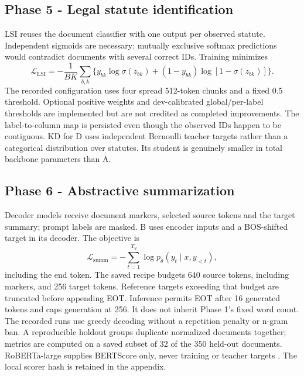 \documentclass[11pt, oneside]{article}
\newcommand{\mainbreak}{\clearpage}
\begin{document}
\mainbreak
\subsection{Phase 5 - Legal statute identification}
LSI reuses the document classifier with one output per observed statute. Independent sigmoids are
necessary: mutually exclusive softmax predictions would contradict documents with several correct IDs.
Training minimizes
\[
\mathcal L_{\mathrm{LSI}}=-\frac1{BK}\sum_{b,k}
\{y_{bk}\log\sigma(z_{bk})+(1-y_{bk})\log[1-\sigma(z_{bk})]\}.
\]
The recorded configuration uses four spread 512-token chunks and a fixed 0.5 threshold. Optional positive
weights and dev-calibrated global/per-label thresholds are implemented but are not credited as completed
improvements. The label-to-column map is persisted even though the observed IDs happen to be contiguous.
KD for D uses independent Bernoulli teacher targets rather than a categorical distribution over statutes.
Its student is genuinely smaller in total backbone parameters than A.

\subsection{Phase 6 - Abstractive summarization}
Decoder models receive document markers, selected source tokens and the target summary; prompt labels
are masked. B uses encoder inputs and a BOS-shifted target in its decoder. The objective is
\[
\mathcal L_{\mathrm{summ}}=-\sum_{t=1}^{T_y}\log p_\theta(y_t\mid x,y_{<t}),
\]
including the end token. The saved recipe budgets 640 source tokens, including markers, and 256 target
tokens. Reference targets exceeding that budget are truncated before appending EOT. Inference permits
EOT after 16 generated tokens and caps generation at 256. It does not inherit Phase 1's fixed word count.
The recorded runs use greedy decoding without a repetition penalty or n-gram ban. A reproducible holdout
groups duplicate normalized documents together; metrics are computed on a saved subset of 32 of the
350 held-out documents. RoBERTa-large supplies BERTScore only, never training or teacher targets
\cite{bertscore}. The local scorer hash is retained in the appendix.
\end{document}
